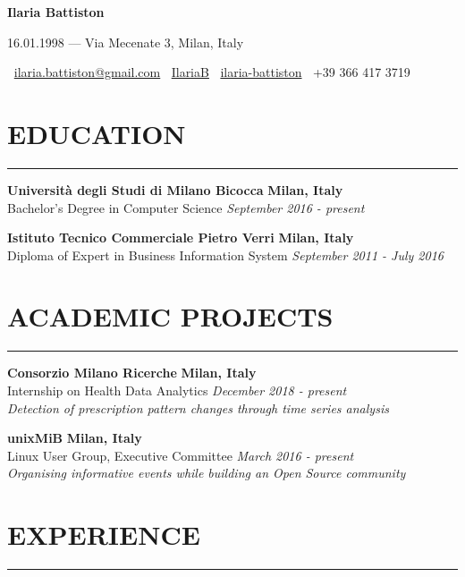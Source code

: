 \documentclass[10pt]{article}
\begin{document}
	\begin{center}
		{\LARGE \textbf{Ilaria Battiston}}
		
		{\large 16.01.1998 --- Via Mecenate 3, Milan, Italy}
		
		\faEnvelope $\:$ \href{mailto:ilaria.battiston@gmail.com}{ilaria.battiston@gmail.com} \qquad \faGithub $\:$ \href{https://github.com/IlariaB}{IlariaB} \qquad \faLinkedin $\:$ \href{https://www.linkedin.com/in/ilaria-battiston-a53014175/}{ilaria-battiston} \qquad \faMobilePhone $\:$ +39 366 417 3719
	\end{center}
	
	\section*{EDUCATION}
	{\color{darkRed}\rule{\linewidth}{0.5pt}}
	
	\textbf{Università degli Studi di Milano Bicocca}
	\hfill
	\textbf{Milan, Italy} \\
	Bachelor's Degree in Computer Science
	\hfill
	\textit{September 2016 - present}
	
	\textbf{Istituto Tecnico Commerciale Pietro Verri}
	\hfill
	\textbf{Milan, Italy} \\
	Diploma of Expert in Business Information System
	\hfill
	\textit{September 2011 - July 2016}
	
	\section*{ACADEMIC PROJECTS}
	{\color{darkRed}\rule{\linewidth}{0.5pt}}
	
	\textbf{Consorzio Milano Ricerche}
	\hfill
	\textbf{Milan, Italy} \\
	Internship on Health Data Analytics
	\hfill
	\textit{December 2018 - present} \\
	\textit{Detection of prescription pattern changes through time series analysis}
	
	\textbf{unixMiB}
	\hfill
	\textbf{Milan, Italy} \\
	Linux User Group, Executive Committee
	\hfill
	\textit{March 2016  - present} \\
	\textit{Organising informative events while building an Open Source community}
	
	
	\section*{EXPERIENCE}
	{\color{darkRed}\rule{\linewidth}{0.5pt}}
	
\end{document}
